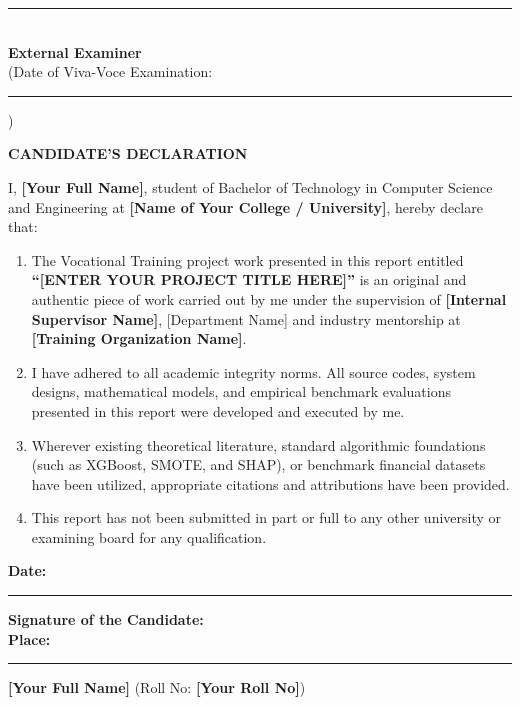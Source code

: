 \documentclass[11pt, a4paper]{article}
\begin{document}
\vspace{1.8cm}
\begin{center}
    \rule{6cm}{0.4pt}\\[0.1cm]
    \textbf{External Examiner}\\[0.1cm]
    (Date of Viva-Voce Examination: \rule{3cm}{0.4pt})
\end{center}

\clearpage

\begin{center}
    {\LARGE \textbf{CANDIDATE'S DECLARATION}}\\[0.8cm]
\end{center}

I, \textbf{[Your Full Name]}, student of Bachelor of Technology in Computer Science and Engineering at \textbf{[Name of Your College / University]}, hereby declare that:

\begin{enumerate}
    \item The Vocational Training project work presented in this report entitled \textbf{``[ENTER YOUR PROJECT TITLE HERE]''} is an original and authentic piece of work carried out by me under the supervision of \textbf{[Internal Supervisor Name]}, [Department Name] and industry mentorship at \textbf{[Training Organization Name]}.
    \item I have adhered to all academic integrity norms. All source codes, system designs, mathematical models, and empirical benchmark evaluations presented in this report were developed and executed by me.
    \item Wherever existing theoretical literature, standard algorithmic foundations (such as XGBoost, SMOTE, and SHAP), or benchmark financial datasets have been utilized, appropriate citations and attributions have been provided.
    \item This report has not been submitted in part or full to any other university or examining board for any qualification.
\end{enumerate}

\vspace{2.5cm}

\noindent
\textbf{Date:} \rule{4cm}{0.4pt} \hfill \textbf{Signature of the Candidate:}\\
\textbf{Place:} \rule{4cm}{0.4pt} \hfill \textbf{[Your Full Name]} (Roll No: \textbf{[Your Roll No]})
\end{document}
